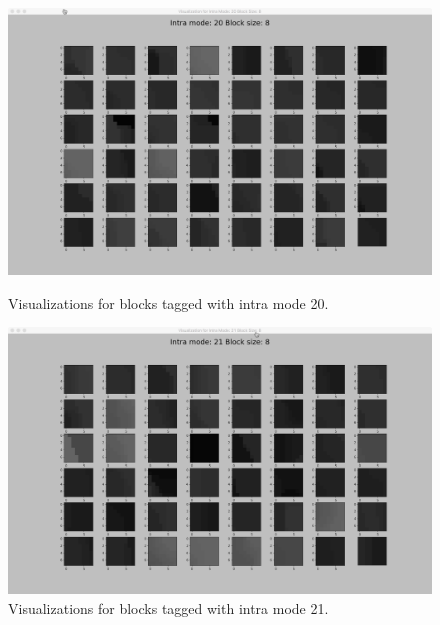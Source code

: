 \begin{figure}
        \vspace*{1cm} %
    
        \begin{minipage}{0.49\textwidth}
            \includegraphics[width=\linewidth]{Figures/visu-size8x8/8-20}
            \caption[Visualizations for blocks tagged with intra mode 20]{Visualizations for blocks tagged with intra mode 20.}
            \label{fig:size8_mode20}
        \end{minipage}
        \hspace{\fill} %
        \begin{minipage}{0.49\textwidth}
            \includegraphics[width=\linewidth]{Figures/visu-size8x8/8-21}
            \caption[Visualizations for blocks tagged with intra mode 21]{Visualizations for blocks tagged with intra mode 21.}
            \label{fig:size8_mode21}
        \end{minipage}
    
    \end{figure}
    
